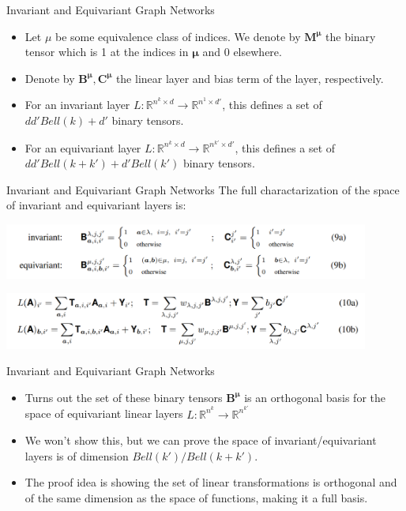 \documentclass{beamer}
\begin{document}
\begin{frame}{Invariant and Equivariant Graph Networks}
    \begin{itemize}
        \setlength{\itemsep}{\fill}
        \item Let $\mu$ be some equivalence class of indices. We denote by $\mathbf{M}^\mathbf{\mu}$ the binary tensor which is 1 at the indices in $\mathbf{\mu}$ and 0 elsewhere.
        \item Denote by $\mathbf{B}^\mathbf{\mu}, \mathbf{C}^\mathbf{\mu}$ the linear layer and bias term of the layer, respectively. 
        \item For an invariant layer $L: \mathbb{R}^{n^k \times d} \rightarrow \mathbb{R}^{n^1 \times d'}$, this defines a set of $dd'Bell(k) + d'$ binary tensors.
        \item For an equivariant layer $L: \mathbb{R}^{n^k \times d} \rightarrow \mathbb{R}^{n^{k'} \times d'}$, this defines a set of $dd'Bell(k+k') + d'Bell(k')$ binary tensors.
    \end{itemize}
\end{frame}
\begin{frame}{Invariant and Equivariant Graph Networks}
    The full charactarization of the space of invariant and equivariant layers is:
    \begin{center}
        \includegraphics[width=0.9\textwidth]{../figures/layer_gener.png}
    \end{center}
    \begin{center}
        \includegraphics[width=0.9\textwidth]{../figures/full_formulation.png}
    \end{center}
\end{frame}
\begin{frame}{Invariant and Equivariant Graph Networks}
    \begin{itemize}
        \setlength{\itemsep}{\fill}
        \item Turns out the set of these binary tensors $\mathbf{B}^\mathbf{\mu}$ is an orthogonal basis for the space of equivariant linear layers $L: \mathbb{R}^{n^k} \rightarrow \mathbb{R}^{n^{k'}}$
        \item We won't show this, but we can prove the space of invariant/equivariant layers is of dimension $Bell(k')/Bell(k + k')$.
        \item The proof idea is showing the set of linear transformations is orthogonal and of the same dimension as the space of functions, making it a full basis.
    \end{itemize}
\end{frame}
\end{document}
